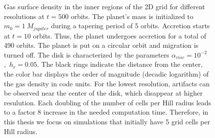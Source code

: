     \begin{figure}[h!]
      \centering
      \begin{minipage}{.3\linewidth}
        \centering
      \end{minipage}%
      \begin{minipage}{.3\linewidth}
        \centering
      \end{minipage}%
      \begin{minipage}{.3\linewidth}
        \centering
      \end{minipage}
      \caption{
        Gas surface density in the inner regions of the 2D grid for 
        different resolutions at $t=500$ orbits. 
        The planet's mass is initialized to $m_0=1\ M_{jupiter}$ during a 
        tapering period of 5 orbits. Accretion starts at $t=10$ orbits.
        Thus, the planet undergoes accretion for a total of 490 orbits.
        The planet is put on a circular orbit and migration is 
        turned off. The disk is characterized by the parameters 
        $\alpha_{visc}=10^{-2}$,\ $h_r=0.05$.
        The black rings indicate the distance from the 
        center, the color bar displays the order of magnitude (decadic 
        logarithm) of the gas density in code units. For the lowest resolution, 
        artifacts can be observed near the center of the disk,
        which disappear at higher resulution. Each doubling of the number 
        of cells per Hill radius leads to a factor 8 increase in the needed 
        computation time. Therefore, in this thesis we focus 
        on simulations that initially have 5 grid cells per Hill radius.
      }
      \label{fig:zoom_in_on_center_of_disk_for_various_resolutions}
    \end{figure}
